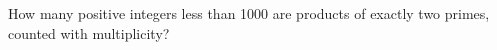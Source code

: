 How many positive integers less than 1000 are products of exactly two primes, counted with multiplicity?
